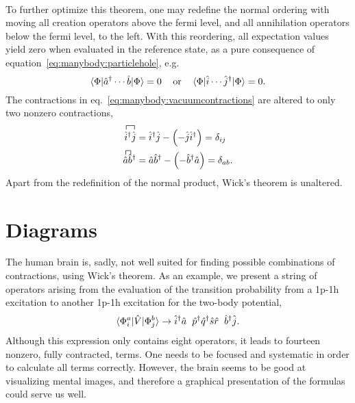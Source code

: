 \paragraph*{}
To further optimize this theorem, one may redefine the normal ordering with
moving all creation operators above the fermi level, and all annihilation
operators below the fermi level, to the left.
With this reordering, all expectation values yield zero when evaluated in the
reference state, as a pure consequence of
equation~\eqref{eq:manybody:particlehole}, e.g. 
\begin{equation}
\langle \Phi |\hat{a}^{\dagger} \cdots \hat{b} | \Phi \rangle = 0
\hspace{3mm}\textrm{ or }\hspace{3mm}
\langle \Phi | \hat{i} \cdots \hat{j}^{\dagger}| \Phi \rangle = 0 .
\end{equation}
The contractions in eq.~\eqref{eq:manybody:vacuumcontractions} are altered
to only two nonzero contractions,
\begin{equation}
\label{eq:manybody:referencecontractions}
\begin{split}
\contraction{}{\hat{i}}{{}^{\dagger}}{\hat{j}}
\hat{i}^{\dagger}\hat{j}
&= \hat{i}^{\dagger}\hat{j} -\left( -  \hat{j} \hat{i}^{\dagger} \right) =
\delta_{ij} \\
%
\contraction{}{\hat{a}}{}{\hat{b}}
\hat{a}\hat{b}^{\dagger}
&=
\hat{a}\hat{b}^{\dagger} - \left(- \hat{b}^{\dagger} \hat{a} \right) =
\delta_{ab}   .
\end{split}
\end{equation}
Apart from the redefinition of the normal product, Wick's theorem is unaltered.





\section{Diagrams}
The human brain is, sadly, not well suited for finding possible combinations of
contractions, using Wick's theorem.
As an example, we present a string of operators
arising from the evaluation of the transition probability from a 1p-1h excitation
to another 1p-1h excitation for the two-body potential, 
\begin{equation}
\label{eq:manybody:example}
\langle \Phi_i^a | \hat{V} | \Phi_j^b \rangle
\rightarrow
\hat{i}^{\dagger} \hat{a} \hspace{2mm} \hat{p}^{\dagger} \hat{q}^{\dagger}
\hat{s} \hat{r} \hspace{2mm} \hat{b}^{\dagger} \hat{j} .
\end{equation}
Although this expression only contains eight operators, it leads to fourteen nonzero,
fully contracted, terms.
One needs to be focused and systematic in order to calculate all terms correctly.
However, the brain seems to be good at visualizing mental images, and therefore a
graphical presentation of the formulas could serve us well.

